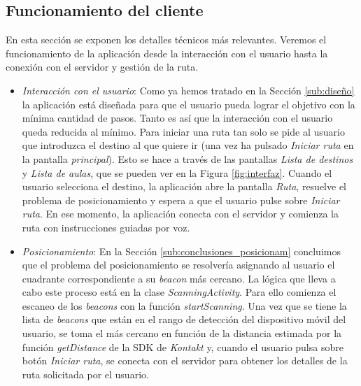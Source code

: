 \subsection{Funcionamiento del cliente}

En esta sección se exponen los detalles técnicos más relevantes. Veremos el funcionamiento de la aplicación desde la interacción con el usuario hasta la conexión con el servidor y gestión de la ruta. 

\begin{itemize}
	\item \textit{Interacción con el usuario}: Como ya hemos tratado en la Sección \ref{sub:diseño} la aplicación está diseñada para que el usuario pueda lograr el objetivo con la mínima cantidad de pasos. Tanto es así que la interacción con el usuario queda reducida al mínimo. Para iniciar una ruta tan solo se pide al usuario que introduzca el destino al que quiere ir (una vez ha pulsado \textit{Iniciar ruta} en la pantalla \textit{principal}). Esto se hace a través de las pantallas \textit{Lista de destinos} y \textit{Lista de aulas}, que se pueden ver en la Figura \ref{fig:interfaz}. Cuando el usuario selecciona el destino, la aplicación abre la pantalla \textit{Ruta}, resuelve el problema de posicionamiento y espera a que el usuario pulse sobre \textit{Iniciar ruta}. En ese momento, la aplicación conecta con el servidor y comienza la ruta con instrucciones guiadas por voz.
	
	\item \textit{Posicionamiento}: En la Sección \ref{sub:conclusiones_posicionam} concluimos que el problema del posicionamiento se resolvería asignando al usuario el cuadrante correspondiente a su \textit{beacon} más cercano. La lógica que lleva a cabo este proceso está en la clase \textit{ScanningActivity}. Para ello comienza el escaneo de los \textit{beacons} con la función \textit{startScanning}. Una vez que se tiene la lista de \textit{beacons} que están en el rango de detección del dispositivo móvil del usuario, se toma el más cercano en función de la distancia estimada por la función \textit{getDistance} de la SDK de \textit{Kontakt} y, cuando el usuario pulsa sobre botón \textit{Iniciar ruta}, se conecta con el servidor para obtener los detalles de la ruta solicitada por el usuario. 
	

\end{itemize}
